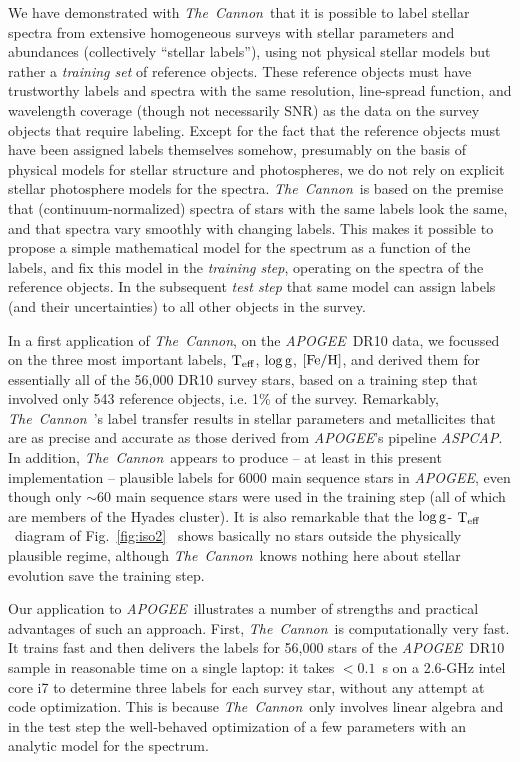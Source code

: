 \documentclass[12pt, preprint]{aastex}
\newcommand{\tc}{\textsl{The~Cannon}}
\newcommand{\apogee}{\textsl{APOGEE}}
\newcommand{\aspcap}{\textsl{ASPCAP}}
\newcommand{\teff}{\mbox{$\rm T_{eff}$}}
\newcommand{\feh}{\mbox{$\rm [Fe/H]$}}
\newcommand{\logg}{\mbox{$\rm \log g$}}
\begin{document}
We have demonstrated with \tc\ that it is possible to label stellar
spectra from extensive homogeneous surveys with stellar parameters 
and abundances (collectively ``stellar labels''), using not physical stellar models but rather a
\emph{training set} of reference objects. These reference objects must have trustworthy
labels and spectra with the same resolution, line-spread function, and
wavelength coverage (though not necessarily SNR) as the data on the 
survey objects that require labeling.
Except for the fact that the reference objects must have been assigned
labels themselves somehow, presumably on the basis of physical models for stellar 
structure and photospheres, we do not rely on explicit stellar photosphere models
for the spectra. \tc\  is based on the premise that (continuum-normalized) spectra of stars with the same labels
look the same, and that spectra vary smoothly with changing labels. 
This makes it possible to propose a simple mathematical model for the spectrum as a function of the
labels, and fix this model in the \textit{training step}, operating on the spectra of the reference objects.
In the subsequent \textit{test step} that same model can assign labels (and their uncertainties) to all
other objects in the survey.

In a first application of \tc, on the \apogee\ DR10 data, we focussed on the three most important labels, \teff, \logg, \feh , and 
derived them for essentially all of the 56,000 DR10 survey stars, based on a training step that involved only 543 reference objects, i.e. 1\% of the survey.  Remarkably, \tc ~'s label transfer results in stellar parameters and metallicites that are as precise and accurate as those derived from
\apogee 's pipeline \aspcap. In addition, \tc\ appears to produce -- at least in this present implementation -- plausible labels for 6000 main sequence stars in \apogee, even though only $\sim 60$ main sequence stars were used in the training step (all of which are members of the Hyades cluster). 
It is also remarkable that  the \logg - \teff\  diagram of Fig.~\ref{fig:iso2}~ shows basically no stars outside
the physically plausible regime, although \tc\ knows nothing here about stellar evolution save the training step.

Our application to \apogee\  illustrates a number of strengths and practical advantages of such an approach. First, \tc\ is computationally very fast. It  trains fast and then delivers the labels for 56,000 stars of the
 \apogee\ DR10 sample in reasonable time on a single laptop: it takes $<0.1$~s on a 2.6-GHz
intel core i7 to determine three labels for each survey star, without any
attempt at code optimization. This is because \tc\  only involves linear algebra and in the test step the well-behaved optimization of a few parameters with an analytic model for the spectrum. 
\end{document}
